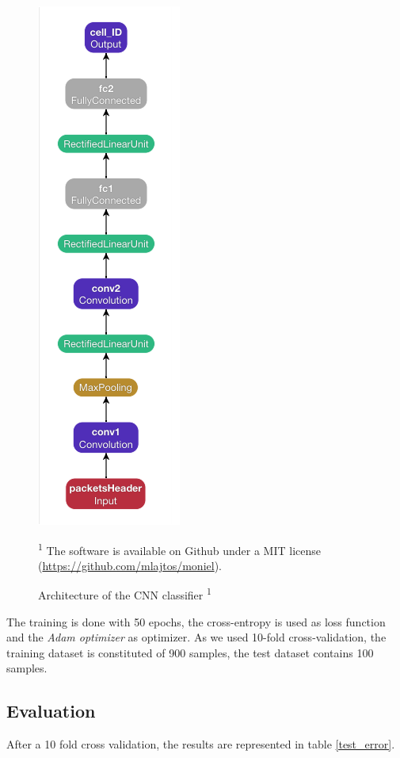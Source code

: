 \documentclass[10pt,conference,compsocconf]{IEEEtran}
\begin{document}
\begin{figure}
    \centering
    \includegraphics[scale=0.5]{model.png}
    \caption{Architecture of the CNN classifier \textsuperscript{1}}
    \small\textsuperscript{1} The software is available on Github under a MIT license (\url{https://github.com/mlajtos/moniel}).
    \label{model_arch}
\end{figure}
The training is done with 50 epochs, the cross-entropy is used as loss function and the \textit{Adam optimizer} as optimizer. As we used 10-fold cross-validation, the training dataset is constituted of 900 samples, the test dataset contains 100 samples.



\subsection{Evaluation}
After a 10 fold cross validation, the results are represented in table \ref{test_error}.
\end{document}
